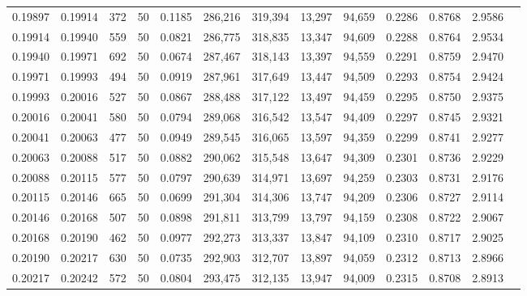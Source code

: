 \begin{tabular}{rrrrrrrrrrrrr}
0.19897 & 0.19914 &   372 &  50 &                                     0.1185 & 286,216 & 319,394 &  13,297 &  94,659 & 0.2286 & 0.8768 & 2.9586 \\
0.19914 & 0.19940 &   559 &  50 &                                     0.0821 & 286,775 & 318,835 &  13,347 &  94,609 & 0.2288 & 0.8764 & 2.9534 \\
0.19940 & 0.19971 &   692 &  50 &                                     0.0674 & 287,467 & 318,143 &  13,397 &  94,559 & 0.2291 & 0.8759 & 2.9470 \\
0.19971 & 0.19993 &   494 &  50 &                                     0.0919 & 287,961 & 317,649 &  13,447 &  94,509 & 0.2293 & 0.8754 & 2.9424 \\
0.19993 & 0.20016 &   527 &  50 &                                     0.0867 & 288,488 & 317,122 &  13,497 &  94,459 & 0.2295 & 0.8750 & 2.9375 \\
0.20016 & 0.20041 &   580 &  50 &                                     0.0794 & 289,068 & 316,542 &  13,547 &  94,409 & 0.2297 & 0.8745 & 2.9321 \\
0.20041 & 0.20063 &   477 &  50 &                                     0.0949 & 289,545 & 316,065 &  13,597 &  94,359 & 0.2299 & 0.8741 & 2.9277 \\
0.20063 & 0.20088 &   517 &  50 &                                     0.0882 & 290,062 & 315,548 &  13,647 &  94,309 & 0.2301 & 0.8736 & 2.9229 \\
0.20088 & 0.20115 &   577 &  50 &                                     0.0797 & 290,639 & 314,971 &  13,697 &  94,259 & 0.2303 & 0.8731 & 2.9176 \\
0.20115 & 0.20146 &   665 &  50 &                                     0.0699 & 291,304 & 314,306 &  13,747 &  94,209 & 0.2306 & 0.8727 & 2.9114 \\
0.20146 & 0.20168 &   507 &  50 &                                     0.0898 & 291,811 & 313,799 &  13,797 &  94,159 & 0.2308 & 0.8722 & 2.9067 \\
0.20168 & 0.20190 &   462 &  50 &                                     0.0977 & 292,273 & 313,337 &  13,847 &  94,109 & 0.2310 & 0.8717 & 2.9025 \\
0.20190 & 0.20217 &   630 &  50 &                                     0.0735 & 292,903 & 312,707 &  13,897 &  94,059 & 0.2312 & 0.8713 & 2.8966 \\
0.20217 & 0.20242 &   572 &  50 &                                     0.0804 & 293,475 & 312,135 &  13,947 &  94,009 & 0.2315 & 0.8708 & 2.8913 \\

\end{tabular}
